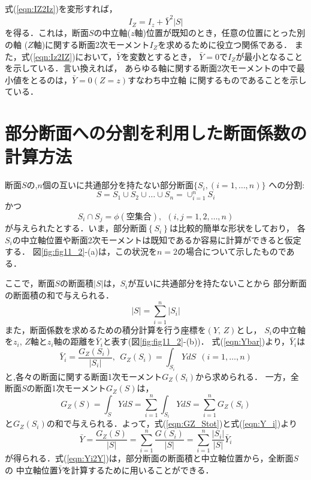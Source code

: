 \documentclass[10pt,a4j]{jarticle}
\begin{document}
式(\ref{eqn:IZ2Iz})を変形すれば，
\begin{equation}
	I_Z=I_z+\bar Y^2 \left| S \right|
	\label{eqn:Iz2IZ}
\end{equation}
を得る．これは，断面$S$の中立軸($z$軸)位置が既知のとき，任意の位置にとった別の軸
($Z$軸)に関する断面2次モーメント$I_Z$を求めるために役立つ関係である．
また，式(\ref{eqn:Iz2IZ})において，$\bar{Y}$を変数とするとき，
$\bar{Y}=0$で$I_Z$が最小となることを示している．言い換えれば，
あらゆる軸に関する断面2次モーメントの中で最小値をとるのは，$\bar Y=0 (Z=z)$すなわち中立軸
に関するものであることを示している．
\section{部分断面への分割を利用した断面係数の計算方法}
断面$S$の,$n$個の互いに共通部分を持たない部分断面$\{ S_i, (i=1,\dots, n)\}$
への分割:
\begin{equation}
	S=S_1\cup S_2 \cup \dots \cup S_n=\cup_{i=1}^n S_i
	\label{eqn:cup_Si}
\end{equation}
かつ
\begin{equation}
	S_i \cap S_j =\phi(空集合), \ \ (i,j=1,2,\dots ,n ) 
	\label{eqn:cap_Si}
\end{equation}
が与えられたとする．いま，部分断面$\left\{ S_i \right\}$は比較的簡単な形状をしており，
各$S_i$の中立軸位置や断面2次モーメントは既知であるか容易に計算ができると仮定する．
図\ref{fig:fig11_2}-(a)は，この状況を$n=2$の場合について示したものである．


ここで，断面$S$の断面積$\left| S \right|$は，$S_i$が互いに共通部分を持たないことから
部分断面の断面積の和で与えられる．
\begin{equation}
	\left|S\right| = \sum_{i=1}^n \left| S_i \right|
	\label{eqn:Stot}
\end{equation}
また，断面係数を求めるための積分計算を行う座標を$(Y,\,Z)$とし，
$S_i$の中立軸を$z_i$, $Z$軸と$z_i$軸の距離を$\bar Y_i$と表す(図\ref{fig:fig11_2}-(b))．
式(\ref{eqn:Ybar})より，$\bar Y_i$は
\begin{equation}
	\bar{Y}_i = \frac{G_Z(S_i)}{\left| S_i \right|}, 
	\ \ G_Z(S_i)=\int_{S_i}YdS
\ \ (i=1,\dots,n)
	\label{eqn:Y_i}
\end{equation}
と,各々の断面に関する断面1次モーメント$G_Z(S_i)$から求められる．
一方，全断面$S$の断面1次モーメント$G_Z(S)$は，
\begin{equation}
	G_Z(S)=\int_SYdS
	=\sum_{i=1}^n \int_{S_i} YdS
	=\sum_{i=1}^n G_Z(S_i)
	\label{eqn:GZ_Stot}
\end{equation}
と$G_Z(S_i)$の和で与えられる．よって，式(\ref{eqn:GZ_Stot})と式(\ref{eqn:Y_i})より
\begin{equation}
	\bar Y 
	= \frac{G_Z(S)}{\left| S \right|}
	= \sum_{i=1}^n \frac{G(S_i)}{\left| S \right|}
	= \sum_{i=1}^n \frac{\left| S_i\right|}{\left| S \right|}\bar{Y}_i
	\label{eqn:Yi2Y}
\end{equation}
が得られる．式(\ref{eqn:Yi2Y})は，部分断面の断面積と中立軸位置から，全断面$S$の
中立軸位置$\bar Y$を計算するために用いることができる．
\end{document}
